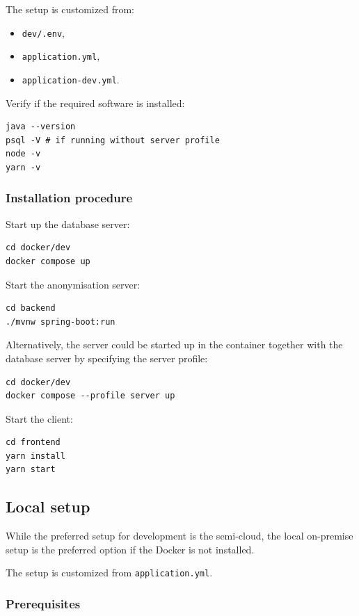 \documentclass[a4paper,twoside,12pt]{book}
\begin{document}
The setup is customized from:
\begin{itemize}
\item \verb|dev/.env|,
\item \verb|application.yml|,
\item \verb|application-dev.yml|.
\end{itemize}

Verify if the required software is installed:
\begin{verbatim}
java --version
psql -V # if running without server profile
node -v
yarn -v
\end{verbatim}


\subsubsection{Installation procedure}
Start up the database server:
\begin{verbatim}
cd docker/dev
docker compose up
\end{verbatim}

Start the anonymisation server:
\begin{verbatim}
cd backend
./mvnw spring-boot:run
\end{verbatim}

Alternatively, the server could be started up in the container together with the database server by specifying the server profile:
\begin{verbatim}
cd docker/dev
docker compose --profile server up
\end{verbatim}



Start the client:
\begin{verbatim}
cd frontend
yarn install
yarn start
\end{verbatim}

\subsection{Local setup}

While the preferred setup for development is the semi-cloud, the local on-premise setup is the preferred option if the Docker is not installed.

The setup is customized from \verb|application.yml|.

\subsubsection{Prerequisites}
\end{document}
